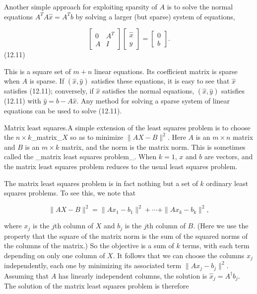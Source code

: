 Another simple approach for exploiting sparsity of \(A\) is to solve the normal equations \(A^{T}A\hat{x}=A^{T}b\) by solving a larger (but sparse) system of equations,

\[\left[\begin{array}{cc}0&A^{T}\\ A&I\end{array}\right]\left[\begin{array}{c}\hat{x}\\ \hat{y}\end{array}\right]=\left[\begin{array}{c}0\\ b\end{array}\right].\] (12.11)

This is a square set of \(m+n\) linear equations. Its coefficient matrix is sparse when \(A\) is sparse. If \((\hat{x},\hat{y})\) satisfies these equations, it is easy to see that \(\hat{x}\) satisfies (12.11); conversely, if \(\hat{x}\) satisfies the normal equations, \((\hat{x},\hat{y})\) satisfies (12.11) with \(\hat{y}=b-A\hat{x}\). Any method for solving a sparse system of linear equations can be used to solve (12.11).

Matrix least squares.A simple extension of the least squares problem is to choose the \(n\times k\)_matrix_\(X\) so as to minimize \(\|AX-B\|^{2}\). Here \(A\) is an \(m\times n\) matrix and \(B\) is an \(m\times k\) matrix, and the norm is the matrix norm. This is sometimes called the _matrix least squares problem_. When \(k=1\), \(x\) and \(b\) are vectors, and the matrix least squares problem reduces to the usual least squares problem.

The matrix least squares problem is in fact nothing but a set of \(k\) ordinary least squares problems. To see this, we note that

\[\|AX-B\|^{2}=\|Ax_{1}-b_{1}\|^{2}+\cdots+\|Ax_{k}-b_{k}\|^{2},\]

where \(x_{j}\) is the \(j\)th column of \(X\) and \(b_{j}\) is the \(j\)th column of \(B\). (Here we use the property that the square of the matrix norm is the sum of the squared norms of the columns of the matrix.) So the objective is a sum of \(k\) terms, with each term depending on only one column of \(X\). It follows that we can choose the columns \(x_{j}\) independently, each one by minimizing its associated term \(\|Ax_{j}-b_{j}\|^{2}\). Assuming that \(A\) has linearly independent columns, the solution is \(\hat{x}_{j}=A^{\dagger}b_{j}\). The solution of the matrix least squares problem is therefore

